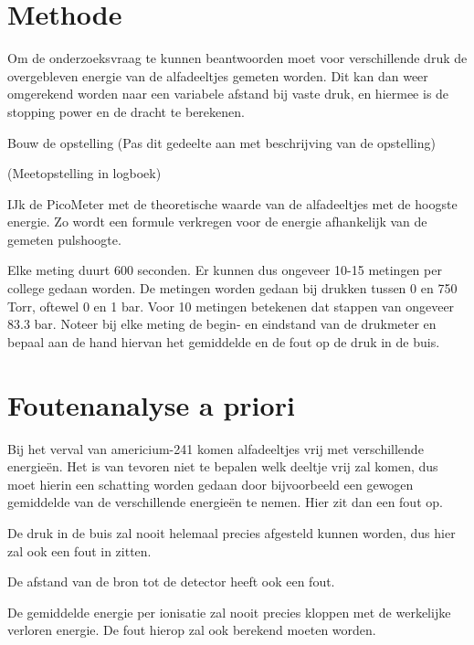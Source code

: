 \documentclass[11pt,a4paper]{article}
\begin{document}
\section{Methode}
Om de onderzoeksvraag te kunnen beantwoorden moet voor verschillende druk de overgebleven energie van de alfadeeltjes gemeten worden. Dit kan dan weer omgerekend worden naar een variabele afstand bij vaste druk, en hiermee is de stopping power en de dracht te berekenen.\par
Bouw de opstelling (Pas dit gedeelte aan met beschrijving van de opstelling)\par
(Meetopstelling in logboek)\par
IJk de PicoMeter met de theoretische waarde van de alfadeeltjes met de hoogste energie. Zo wordt een formule verkregen voor de energie afhankelijk van de gemeten pulshoogte. \par
Elke meting duurt 600 seconden. Er kunnen dus ongeveer 10-15 metingen per college gedaan worden. De metingen worden gedaan bij drukken tussen 0 en 750 Torr, oftewel 0 en 1 bar. Voor 10 metingen betekenen dat stappen van ongeveer 83.3 bar. Noteer bij elke meting de begin- en eindstand van de drukmeter en bepaal aan de hand hiervan het gemiddelde en de fout op de druk in de buis.\par

\section{Foutenanalyse a priori}
Bij het verval van americium-241 komen alfadeeltjes vrij met verschillende energieën. Het is van tevoren niet te bepalen welk deeltje vrij zal komen, dus moet hierin een schatting worden gedaan door bijvoorbeeld een gewogen gemiddelde van de verschillende energieën te nemen. Hier zit dan een fout op. \par
De druk in de buis zal nooit helemaal precies afgesteld kunnen worden, dus hier zal ook een fout in zitten. \par
De afstand van de bron tot de detector heeft ook een fout. \par
De gemiddelde energie per ionisatie zal nooit precies kloppen met de werkelijke verloren energie. De fout hierop zal ook berekend moeten worden. \par








\end{document}
